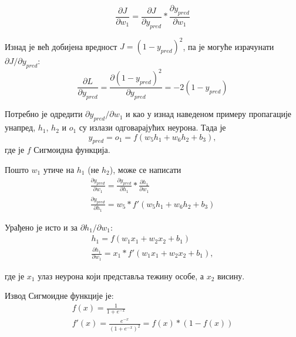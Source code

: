 \documentclass[12pt, а4paper]{article}
\begin{document}
\begin{equation}
\frac{\partial J}{\partial w_1} = \frac{\partial J}{\partial y_{pred}} * \frac{\partial y_{pred}}{\partial w_1}
\end{equation}

Изнад је већ добијена вредност $J = (1 - y_{pred})^2$, па је могуће израчунати
$\partial J / \partial y_{pred}$:
\begin{equation}
\frac{\partial L}{\partial y_{pred}} = \frac{\partial (1 - y_{pred})^2}{\partial y_{pred}} = -2(1 - y_{pred})
\end{equation}

Потребно је одредити $\partial y_{pred} / \partial w_1$ и као у изнад
наведеном примеру пропагације унапред, $h_1$, $h_2$ и $o_1$ су излази
одговарајућих неурона. Тада је
\begin{equation}
y_{pred} = o_1 = f(w_5 h_1 + w_6 h_2 + b_3),
\end{equation}
где је $f$ Сигмоидна функција.

Пошто $w_1$ утиче на $h_1$ (не $h_2$), може се написати
\begin{equation}
\begin{gathered}
\frac{\partial y_{pred}}{\partial w_1} = \frac{\partial y_{pred}}{\partial h_1} * \frac{\partial h_1}{\partial w_1} \\
\frac{\partial y_{pred}}{\partial h_1} = w_5 * f'(w_5 h_1 + w_6 h_2 + b_3)
\end{gathered}
\end{equation}

Урађено је исто и за $\partial h_1 / \partial w_1$:
\begin{equation}
\begin{gathered}
h_1 = f(w_1 x_1 + w_2 x_2 + b_1) \\
\frac{\partial h_1}{\partial w_1} = x_1 * f'(w_1 x_1 + w_2 x_2 + b_1),
\end{gathered}
\end{equation}

где је $x_1$ улаз неурона који представља тежину особе, а $x_2$ висину.

Извод Сигмоидне функције је:
\begin{equation}
\begin{gathered}
f(x) = \frac{1}{1 + e^{-x}} \\
f'(x) = \frac{e^{-x}}{(1 + e^{-x})^2} = f(x) * (1 - f(x))
\end{gathered}
\label{eq:izvod}
\end{equation}
\end{document}
